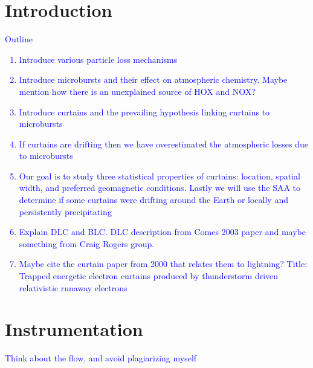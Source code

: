 \documentclass[draft]{agujournal2019}
\begin{document}
\section{Introduction}
\textcolor{blue}{
Outline
\begin{enumerate}
\item Introduce various particle loss mechanisms
\item Introduce microbursts and their effect on atmospheric chemistry. Maybe mention how there is an unexplained source of HOX and NOX?
\item Introduce curtains and the prevailing hypothesis linking curtains to microbursts
\item If curtains are drifting then we have overestimated the atmospheric losses due to microbursts 
\item Our goal is to study three statistical properties of curtains: location, spatial width, and preferred geomagnetic conditions. Lastly we will use the SAA to determine if some curtains were drifting around the Earth or locally and persistently precipitating
\item Explain DLC and BLC. DLC description from Comes 2003 paper and maybe something from Craig Rogers group.
\item Maybe cite the curtain paper from 2000 that relates them to lightning? Title: Trapped energetic electron curtains produced by thunderstorm driven relativistic runaway electrons
\end{enumerate}
}

\section{Instrumentation} \label{instrumentation}
\textcolor{blue}{Think about the flow, and avoid plagiarizing myself}
\end{document}
